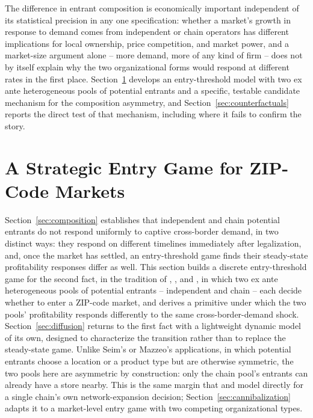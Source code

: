 \documentclass[english,12pt]{article}
\begin{document}
The difference in entrant composition is economically important independent of its statistical precision in any one specification: whether a market's growth in response to demand comes from independent or chain operators has different implications for local ownership, price competition, and market power, and a market-size argument alone -- more demand, more of any kind of firm -- does not by itself explain why the two organizational forms would respond at different rates in the first place. Section~\ref{sec:model} develops an entry-threshold model with two ex ante heterogeneous pools of potential entrants and a specific, testable candidate mechanism for the composition asymmetry, and Section~\ref{sec:counterfactuals} reports the direct test of that mechanism, including where it fails to confirm the story.

\FloatBarrier

\section{A Strategic Entry Game for ZIP-Code Markets}
\label{sec:model}

Section~\ref{sec:composition} establishes that independent and chain potential entrants do not respond uniformly to captive cross-border demand, in two distinct ways: they respond on different timelines immediately after legalization, and, once the market has settled, an entry-threshold game finds their steady-state profitability responses differ as well. This section builds a discrete entry-threshold game for the second fact, in the tradition of \citet{BresnahanReiss1991}, \citet{Mazzeo2002}, and \citet{Seim2006}, in which two ex ante heterogeneous pools of potential entrants -- independent and chain -- each decide whether to enter a ZIP-code market, and derives a primitive under which the two pools' profitability responds differently to the same cross-border-demand shock. Section~\ref{sec:diffusion} returns to the first fact with a lightweight dynamic model of its own, designed to characterize the transition rather than to replace the steady-state game. Unlike Seim's or Mazzeo's applications, in which potential entrants choose a location or a product type but are otherwise symmetric, the two pools here are asymmetric by construction: only the chain pool's entrants can already have a store nearby. This is the same margin that \citet{Nishida2008} and \citet{Holmes2011} model directly for a single chain's own network-expansion decision; Section~\ref{sec:cannibalization} adapts it to a market-level entry game with two competing organizational types.
\end{document}
